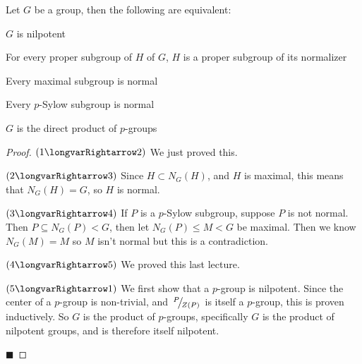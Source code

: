 \documentclass[10pt]{article}
\def\slfrac#1#2{\left.{}^{#1}\mkern-4mu\middle/\mkern-3mu{}_{#2}\right.}
\begin{document}
\begin{thrm*}

    Let $G$ be a group, then the following are equivalent:
    \benum
        \item $G$ is nilpotent
        \item For every proper subgroup of $H$ of $G$, $H$ is a proper subgroup of its normalizer
        \item Every maximal subgroup is normal
        \item Every $p$-Sylow subgroup is normal
        \item $G$ is the direct product of $p$-groups
    \eenum

\end{thrm*}

\let\implies=\longvarRightarrow

\begin{proof}

    \blist
        \item $(1\implies2)$ We just proved this.
        \item $(2\implies3)$ Since $H\subset N_G(H)$, and $H$ is maximal, this means that $N_G(H)=G$, so $H$ is normal.
        \item $(3\implies4)$ If $P$ is a $p$-Sylow subgroup, suppose $P$ is not normal.
        Then $P\subseteq N_G(P)<G$, then let $N_G(P)\leq M<G$ be maximal.
        Then we know $N_G(M)=M$ so $M$ isn't normal but this is a contradiction.
        \item $(4\implies5)$ We proved this last lecture.
        \item $(5\implies1)$ We first show that a $p$-group is nilpotent.
        Since the center of a $p$-group is non-trivial, and $\slfrac{P}{Z(P)}$ is itself a $p$-group, this is proven inductively.
        So $G$ is the product of $p$-groups, specifically $G$ is the product of nilpotent groups, and is therefore itself nilpotent.
    \elist

    \hfill$\blacksquare$

\end{proof}
\end{document}
